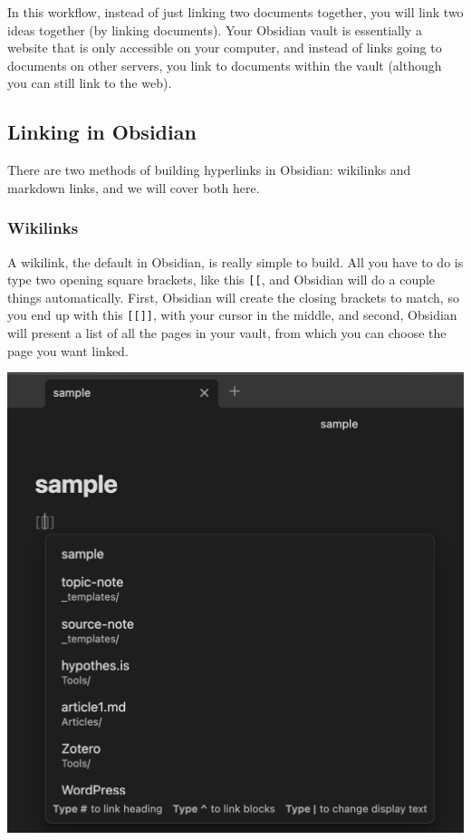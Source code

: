 \documentclass[
]{book}
\theoremstyle{definition}
\theoremstyle{definition}
\theoremstyle{definition}
\theoremstyle{definition}
\theoremstyle{remark}
\begin{document}
In this workflow, instead of just linking two documents together, you will link two ideas together (by linking documents). Your Obsidian vault is essentially a website that is only accessible on your computer, and instead of links going to documents on other servers, you link to documents within the vault (although you can still link to the web).

\hypertarget{linking-in-obsidian}{%
\subsection*{Linking in Obsidian}\label{linking-in-obsidian}}

There are two methods of building hyperlinks in Obsidian: wikilinks and markdown links, and we will cover both here.

\hypertarget{wikilinks}{%
\subsubsection*{Wikilinks}\label{wikilinks}}

A wikilink, the default in Obsidian, is really simple to build. All you have to do is type two opening square brackets, like this \texttt{{[}{[}}, and Obsidian will do a couple things automatically. First, Obsidian will create the closing brackets to match, so you end up with this \texttt{{[}{[}{]}{]}}, with your cursor in the middle, and second, Obsidian will present a list of all the pages in your vault, from which you can choose the page you want linked.

\includegraphics{assets/u3/wikilink.png}
\end{document}
